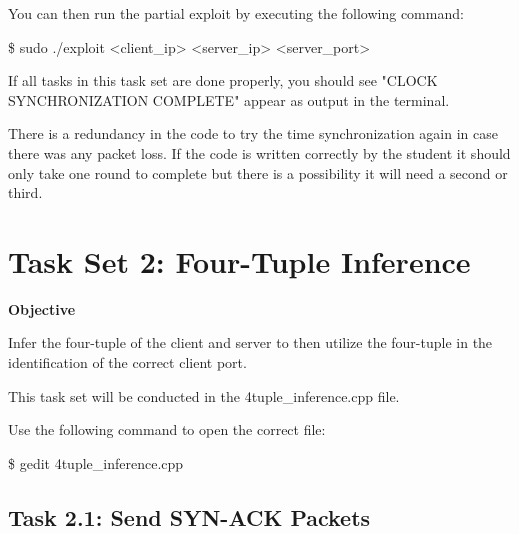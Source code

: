 \documentclass[letterpaper,12pt]{report}
\begin{document}
\begin{sloppypar}
\bigskip

You can then run the partial exploit by executing the following command:

\bigskip

\begin{mdframed}[backgroundcolor=black!10,style=code,nobreak=true,align=center,userdefinedwidth=14cm]
    \$ sudo ./exploit <client\_ip> <server\_ip> <server\_port>
\end{mdframed}

\bigskip

If all tasks in this task set are done properly, you should see "CLOCK SYNCHRONIZATION COMPLETE" appear as output in the terminal.

There is a redundancy in the code to try the time synchronization again in case there was any packet loss. If the code is written correctly by the student it should only take one round to complete but there is a possibility it will need a second or third.


\section*{Task Set 2: Four-Tuple Inference}\label{sec:Task-Set-2}

\textbf{Objective}

Infer the four-tuple of the client and server to then utilize the four-tuple in the identification of the correct client port.

\bigskip

This task set will be conducted in the 4tuple\_inference.cpp file.

Use the following command to open the correct file:

\bigskip

\begin{mdframed}[backgroundcolor=black!10,style=code,nobreak=true,align=center,userdefinedwidth=14cm]
    \$ gedit 4tuple\_inference.cpp
\end{mdframed}

\subsection*{Task 2.1: Send SYN-ACK Packets}\label{sec:Task-2.1-Send-SYN-ACK-Packets}


\end{sloppypar}
\end{document}

